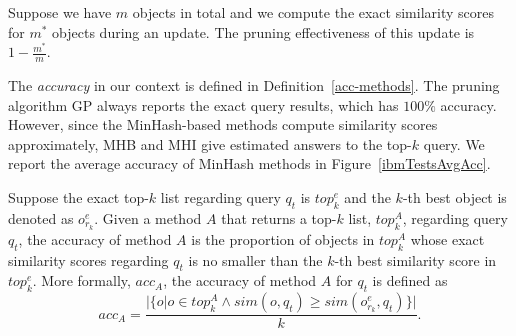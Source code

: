 \begin{definition}\label{preff-def}
Suppose we have $m$ objects in total and we compute the exact similarity scores for $m^*$ objects during an update. The pruning effectiveness of this update is $1 - \frac{m^*}{m}$. 
\end{definition}

The \emph{accuracy} in our context is defined in Definition~\ref{acc-methods}. The pruning algorithm GP always reports the exact query results, which has $100\%$ accuracy. However, since the MinHash-based methods compute similarity scores approximately, MHB and MHI give estimated answers to the top-$k$ query. We report the average accuracy of MinHash methods in Figure~\ref{ibmTestsAvgAcc}. 

\begin{definition}\label{acc-methods}
Suppose the exact top-$k$ list regarding query $q_t$ is $top_k^{e}$ and the $k$-th best object is denoted as $o_{r_k}^e$. Given a method $A$ that returns a top-$k$ list, $top_k^A$, regarding query $q_t$, the accuracy of method $A$ is the proportion of objects in $top_k^A$ whose exact similarity scores regarding $q_t$ is no smaller than the $k$-th best similarity score in $top_k^{e}$. More formally, $acc_A$, the accuracy of method $A$ for $q_t$ is defined as $$acc_A = \frac{|\{o|o \in top_k^A \land sim(o, q_t)\geq sim(o_{r_k}^e, q_t)\}|}{k}\text{.}$$
\end{definition}

